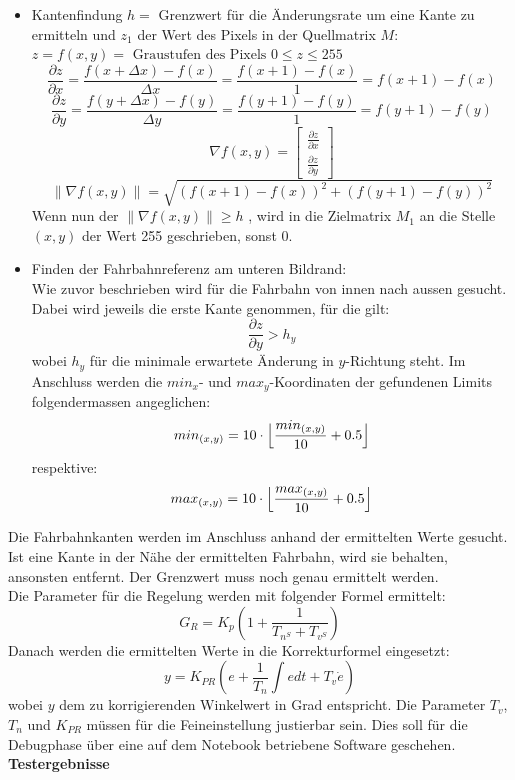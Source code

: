 \begin{itemize}
\item Kantenfindung $h=$ Grenzwert für die Änderungsrate um eine Kante zu ermitteln und $z_1$ der Wert des Pixels in der Quellmatrix $M$:
$z = f(x,y) = \text{ Graustufen des Pixels }0 \leq z \leq 255$\\
\[
\frac{\partial{z}}{\partial{x}}=\frac{f(x+\Delta{x})-f(x)}{\Delta{x}} = \frac{f(x+1)-f(x)}{1} = f(x+1)-f(x)
\]
\[
\frac{\partial{z}}{\partial{y}}=\frac{f(y+\Delta{x})-f(y)}{\Delta{y}} = \frac{f(y+1)-f(y)}{1} = f(y+1)-f(y)
\]
\[
\nabla f(x,y) = \begin{bmatrix}
\frac{\partial{z}}{\partial{x}}\\
\frac{\partial{z}}{\partial{y}}
\end{bmatrix}
\]
\[
\lVert\nabla f(x,y)\rVert = \sqrt{(f(x+1)-f(x))^2 + (f(y+1) - f(y))^2}
\]
Wenn nun der $\lVert\nabla f(x,y)\rVert \geq h$ , wird in die Zielmatrix $M_1$ an die Stelle $(x,y)$ der Wert 255 geschrieben, sonst 0.
\item Finden der Fahrbahnreferenz am unteren Bildrand:\\
Wie zuvor beschrieben wird für die Fahrbahn von innen nach aussen gesucht. Dabei wird jeweils die erste Kante genommen, für die gilt:
\[
\frac{\partial{z}}{\partial{y}} > h_y
\]
wobei $h_y$ für die minimale erwartete Änderung in $y$-Richtung steht. Im Anschluss werden die $min_x$- und $max_y$-Koordinaten der gefundenen Limits folgendermassen angeglichen:
\[
min_{(x,y)} = 10\cdot\Bigl\lfloor\frac{min_{(x,y)}}{10}+0.5\Bigr\rfloor
\]
respektive:
\[
max_{(x,y)} = 10\cdot\Bigl\lfloor\frac{max_{(x,y)}}{10}+0.5\Bigr\rfloor
\]
\end{itemize}
Die Fahrbahnkanten werden im Anschluss anhand der ermittelten Werte gesucht. Ist eine Kante in der Nähe der ermittelten Fahrbahn, wird sie behalten, ansonsten entfernt. Der Grenzwert muss noch genau ermittelt werden.\\
Die Parameter für die Regelung werden mit folgender Formel ermittelt:
\[
G_R = K_p\left(1 + \frac{1}{T_{n^S} + T_{v^S}}\right)
\]
Danach werden die ermittelten Werte in die Korrekturformel eingesetzt:
\[
y = K_{PR}\left(e + \frac{1}{T_n}\int{edt} + T_v\dot{e}\right)
\]
wobei $y$ dem zu korrigierenden Winkelwert in Grad entspricht. Die Parameter $T_v$, $T_n$ und $K_{PR}$ müssen für die Feineinstellung justierbar sein. Dies soll für die Debugphase über eine auf dem Notebook betriebene Software geschehen.
\\[0.2cm]
\textbf{Testergebnisse}\\[0.2cm]
